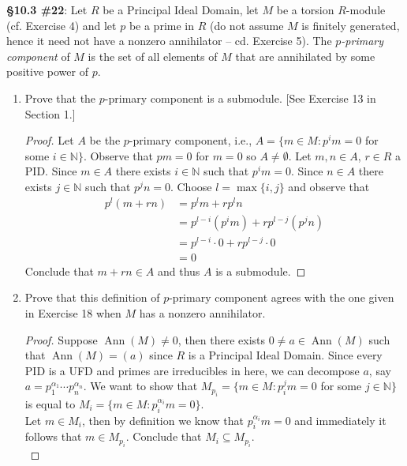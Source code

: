 \documentclass[8pt]{amsart}
\theoremstyle{plain}%
\theoremstyle{definition}
\theoremstyle{remark}
\numberwithin{equation}{section}
\newcommand{\N}{\mathbb{N}}
\begin{document}
\textbf{\S 10.3 \#22}: Let $R$ be a Principal Ideal Domain, let $M$ be a torsion $R$-module (cf. Exercise 4) and let $p$ be a prime in $R$ (do not assume $M$ is finitely generated, hence it need not have a nonzero annihilator -- cd. Exercise 5). The \textit{$p$-primary component} of $M$ is the set of all elements of $M$ that are annihilated by some positive power of $p$.
	\begin{enumerate}
		\item Prove that the $p$-primary component is a submodule. [See Exercise 13 in Section 1.]
			\begin{proof}
				Let $A$ be the $p$-primary component, i.e.,  $A = \{m \in M : p^im = 0$ for some $i \in \N\}$. Observe that $pm = 0$ for $m = 0$ so $A \neq \emptyset$. Let $m, n \in A$, $r \in R$ a PID. Since $m \in A$ there exists $i \in \N$ such that $p^im = 0$. Since $n \in A$ there exists $j \in \N$ such that $p^jn = 0$. Choose $l = \max\{i, j\}$ and observe that
				\begin{align*}
					p^l(m + rn) &= p^lm + rp^ln\\
					&= p^{l - i}(p^im) + rp^{l - j}(p^jn)\\
					&= p^{l - i} \cdot 0 + rp^{l - j} \cdot 0\\
					&= 0
				\end{align*}
				Conclude that $m + rn \in A$ and thus $A$ is a submodule.
			\end{proof}
		\item Prove that this definition of $p$-primary component agrees with the one given in Exercise 18 when $M$ has a nonzero annihilator.
			\begin{proof}
				Suppose $\operatorname{Ann}(M) \neq 0$, then there exists $0 \neq a \in \operatorname{Ann}(M)$ such that $\operatorname{Ann}(M) = (a)$ since $R$ is a Principal Ideal Domain. Since every PID is a UFD and primes are irreducibles in here, we can decompose $a$, say $a = p_1^{\alpha_1}\cdots p_n^{\alpha_n}$. We want to show that $M_{p_i} = \{m \in M : p_i^jm = 0$ for some $j \in \N\}$ is equal to $M_i = \{m \in M : p_i^{\alpha_i}m = 0\}$.\\

				Let $m \in M_i$, then by definition we know that $p_i^{\alpha_i}m = 0$ and immediately it follows that $m \in M_{p_i}$. Conclude that $M_i \subseteq M_{p_i}$.\\


\end{proof}
\end{enumerate}
\end{document}
